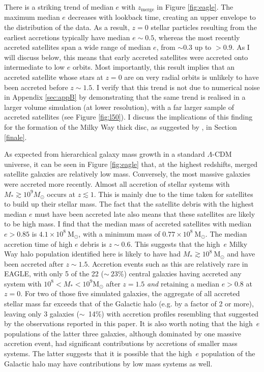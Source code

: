 There is a striking trend of median $e$ with $z_{\mathrm{merge}}$
in Figure \ref{fig:eagle}. The maximum median $e$ decreases with
lookback time, creating an upper envelope to the distribution of
the data.  As a result, $z=0$ stellar particles resulting from the
earliest accretions typically have median $e\sim0.5$, whereas the
most recently accreted satellites span a wide range of median
$e$, from $\sim 0.3$ up to $> 0.9$.  As I will discuss below, this means
that early accreted satellites were accreted onto intermediate to
low $e$ orbits.  Most importantly, this result implies that 
an accreted satellite whose stars at $z=0$ are on very radial orbits is
unlikely to have been accreted before $z\sim1.5$. I
verify that this trend is not due to numerical noise in Appendix
\ref{sec:appB} by demonstrating that the same trend is realised
in a larger volume simulation (at lower resolution), with a far
larger sample of accreted satellites (see Figure \ref{fig:l50}). I
discuss the implications of this finding for the formation of the
Milky Way thick disc, as suggested by \citet{2018arXiv180606038H},
in Section \ref{finale}.

As expected from hierarchical galaxy mass growth in a
standard $\Lambda$-CDM universe, it can be seen in Figure \ref{fig:eagle}
that, at the highest redshifts, merged satellite galaxies are
relatively low mass.  Conversely, the most massive galaxies
were accreted more recently.  Almost all accretion of stellar systems
with $M_* \gtrsim 10^9 M_\odot$ occurs at $z \lesssim 1$.
This is mainly due to the time taken for satellites to build up
their stellar mass. The fact that the satellite debris with the
highest median $e$ must have been accreted late also means that
these satellites are likely to be high mass. I find that the median
mass of accreted satellites with median $e>0.85$ is $4.1\times
10^{8}\ \mathrm{M_{\odot}}$, with a minimum mass of $0.77 \times
10^{8}\ \mathrm{M_{\odot}}$. The median accretion time of high $e$
debris is $z \sim 0.6$. This suggests that the high~$e$ Milky Way
halo population identified here is likely to have had  $M_* \gtrsim
10^{8}\ \mathrm{M_{\odot}}$ and have been accreted after $z\sim
1.5$.  Accretion events such as this are relatively rare in EAGLE,
with only 5 of the 22 ($\sim~23\%$) central galaxies having accreted
any system with $10^8 < M_* < 10^9 \mathrm{M_{\odot}}$ after $z=1.5$
\emph{and} retaining a median $e > 0.8$ at $z=0$.  For two of those
five simulated galaxies, the aggregate of all accreted stellar mass
far exceeds that of the Galactic halo (e.g. by a factor of 2 or
more), leaving only 3 galaxies ($\sim$~14\%) with accretion profiles
resembling that suggested by the observations reported in this
paper.  It is also worth noting that the high~$e$ populations of
the latter three galaxies, although dominated by one massive accretion
event, had significant contributions by accretions of smaller
mass systems.  The latter suggests that it is possible that the
high~$e$ population of the Galactic halo may have contributions by
low mass systems as well. 


